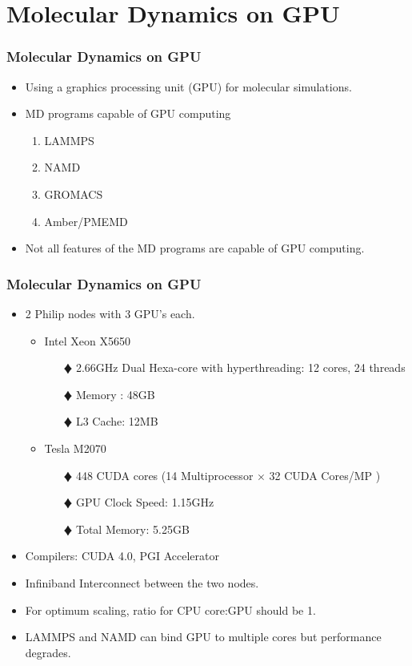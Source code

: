 \documentclass[slidestop,mathserif,compress,xcolor=svgnames]{beamer}
\begin{document}
\section{Molecular Dynamics on GPU}
\begin{frame}
  \frametitle{\small Molecular Dynamics on GPU}
  \begin{itemize}
  \item Using a graphics processing unit (GPU) for molecular simulations.
  \item MD programs capable of GPU computing
    \begin{enumerate}
      \item LAMMPS
      \item NAMD
      \item GROMACS
      \item Amber/PMEMD
    \end{enumerate}
  \item Not all features of the MD programs are capable of GPU computing.
  \end{itemize}
\end{frame}

\begin{frame}
  \frametitle{\small Molecular Dynamics on GPU}
  \begin{itemize}
  \item 2  Philip nodes with 3  GPU's each.
    \begin{itemize}
      \item Intel Xeon X5650
        \begin{enumerate}
          \item[$\vardiamond$] 2.66GHz Dual Hexa-core with hyperthreading: 12 cores, 24 threads
          \item[$\vardiamond$] Memory : 48GB
          \item[$\vardiamond$] L3 Cache: 12MB
        \end{enumerate}
      \item Tesla M2070
        \begin{enumerate}
          \item[$\vardiamond$] 448 CUDA cores (14 Multiprocessor $\times$ 32 CUDA Cores/MP )
          \item[$\vardiamond$] GPU Clock Speed: 1.15GHz
          \item[$\vardiamond$] Total Memory: 5.25GB
        \end{enumerate}
    \end{itemize}
  \item Compilers: CUDA 4.0, PGI Accelerator
  \item Infiniband Interconnect between the two nodes.
  \item For optimum scaling, ratio for CPU core:GPU should be 1. 
  \item LAMMPS and NAMD can bind  GPU to multiple cores but performance degrades.
  \end{itemize}
\end{frame}
\end{document}
